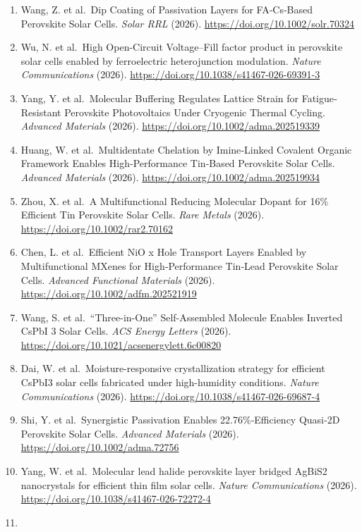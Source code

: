 \documentclass[
  11pt,
]{article}
\begin{document}
\begin{enumerate}
  \url{https://doi.org/10.1002/anie.9286497}
\item
  Wang, Z. et al.~Dip Coating of Passivation Layers for FA‐Cs‐Based
  Perovskite Solar Cells. \emph{Solar RRL} (2026).
  \url{https://doi.org/10.1002/solr.70324}
\item
  Wu, N. et al.~High Open-Circuit Voltage--Fill factor product in
  perovskite solar cells enabled by ferroelectric heterojunction
  modulation. \emph{Nature Communications} (2026).
  \url{https://doi.org/10.1038/s41467-026-69391-3}
\item
  Yang, Y. et al.~Molecular Buffering Regulates Lattice Strain for
  Fatigue‐Resistant Perovskite Photovoltaics Under Cryogenic Thermal
  Cycling. \emph{Advanced Materials} (2026).
  \url{https://doi.org/10.1002/adma.202519339}
\item
  Huang, W. et al.~Multidentate Chelation by Imine‐Linked Covalent
  Organic Framework Enables High‐Performance Tin‐Based Perovskite Solar
  Cells. \emph{Advanced Materials} (2026).
  \url{https://doi.org/10.1002/adma.202519934}
\item
  Zhou, X. et al.~A Multifunctional Reducing Molecular Dopant for 16\%
  Efficient Tin Perovskite Solar Cells. \emph{Rare Metals} (2026).
  \url{https://doi.org/10.1002/rar2.70162}
\item
  Chen, L. et al.~Efficient NiO x Hole Transport Layers Enabled by
  Multifunctional MXenes for High‐Performance Tin‐Lead Perovskite Solar
  Cells. \emph{Advanced Functional Materials} (2026).
  \url{https://doi.org/10.1002/adfm.202521919}
\item
  Wang, S. et al.~``Three-in-One'' Self-Assembled Molecule Enables
  Inverted CsPbI 3 Solar Cells. \emph{ACS Energy Letters} (2026).
  \url{https://doi.org/10.1021/acsenergylett.6c00820}
\item
  Dai, W. et al.~Moisture-responsive crystallization strategy for
  efficient CsPbI3 solar cells fabricated under high-humidity
  conditions. \emph{Nature Communications} (2026).
  \url{https://doi.org/10.1038/s41467-026-69687-4}
\item
  Shi, Y. et al.~Synergistic Passivation Enables 22.76\%‐Efficiency
  Quasi‐2D Perovskite Solar Cells. \emph{Advanced Materials} (2026).
  \url{https://doi.org/10.1002/adma.72756}
\item
  Yang, W. et al.~Molecular lead halide perovskite layer bridged AgBiS2
  nanocrystals for efficient thin film solar cells. \emph{Nature
  Communications} (2026).
  \url{https://doi.org/10.1038/s41467-026-72272-4}
\item

\end{enumerate}
\end{document}
